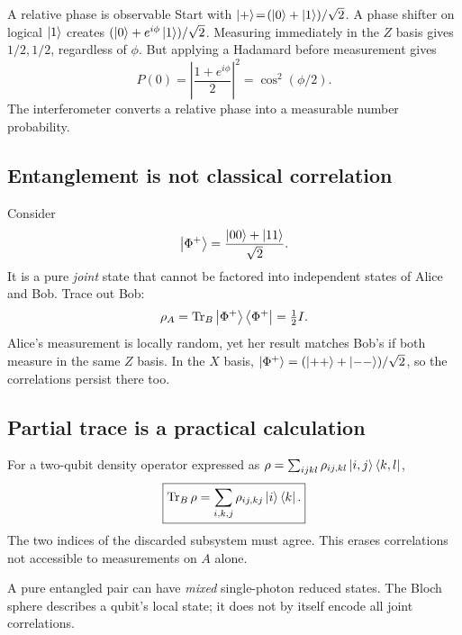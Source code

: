 \begin{worked}{A relative phase is observable}
Start with \(\left\lvert +\right\rangle\!=\!(\left\lvert 0\right\rangle+\left\lvert 1\right\rangle)/\sqrt2\).
A phase shifter on logical \(\left\lvert 1\right\rangle\)
creates \((\left\lvert 0\right\rangle+e^{i\phi}\left\lvert 1\right\rangle)/\sqrt2\).
Measuring immediately in the \(Z\) basis
gives \(1/2,1/2\), regardless of \(\phi\).
But applying a Hadamard before measurement gives
\[
P(0)=\left|\frac{1+e^{i\phi}}2\right|^2
=\boxed{\cos^2(\phi/2)}.
\]
The interferometer converts a relative
phase into a measurable number probability.
\end{worked}

\subsection{Entanglement is not classical correlation}
Consider
\[
\left\lvert \Phi^+\right\rangle=\frac{\left\lvert 00\right\rangle+\left\lvert 11\right\rangle}{\sqrt2}.
\]
It is a pure \emph{joint} state that cannot
be factored into independent states
of Alice and Bob. Trace out Bob:
\[
\rho_A=\operatorname{Tr}_B
\left\lvert \Phi^+\right\rangle\left\langle \Phi^+\right\rvert=\tfrac12I.
\]
Alice's measurement is locally random,
yet her result matches Bob's if both
measure in the same \(Z\) basis.
In the \(X\) basis,
\(\left\lvert \Phi^+\right\rangle=(\left\lvert ++\right\rangle+\left\lvert --\right\rangle)/\sqrt2\),
so the correlations persist there too.

\subsection{Partial trace is a practical calculation}
For a two-qubit density operator expressed
as \(\rho=\sum_{ijkl}\rho_{ij,kl}\left\lvert i,j\right\rangle\left\langle k,l\right\rvert\),
\[
\boxed{\operatorname{Tr}_B\rho=
\sum_{i,k,j}\rho_{ij,kj}\left\lvert i\right\rangle\left\langle k\right\rvert.}
\]
The two indices of the discarded subsystem
must agree. This erases correlations not
accessible to measurements on \(A\) alone.

\begin{checkpoint}
A pure entangled pair can have \emph{mixed}
single-photon reduced states. The Bloch sphere
describes a qubit's local state; it does not
by itself encode all joint correlations.
\end{checkpoint}
